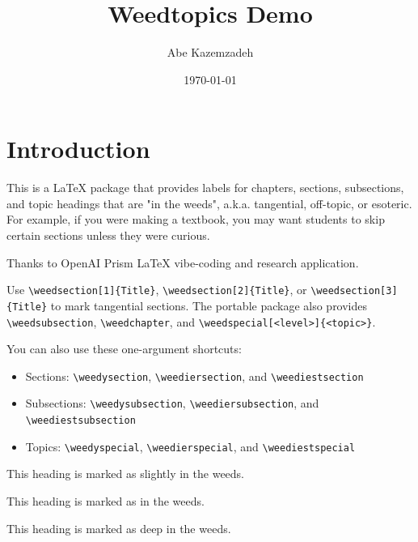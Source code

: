 \documentclass[11pt]{article}
\title{Weedtopics Demo}
\author{Abe Kazemzadeh}
\date{\today}
\begin{document}
\maketitle
\tableofcontents

\section{Introduction}

This is a LaTeX package that provides labels for chapters, sections, subsections, and topic headings
that are "in the weeds", a.k.a. tangential, off-topic, or esoteric.  For example, if you were making 
a textbook, you may want students to skip certain sections unless they were curious.

Thanks to OpenAI Prism \LaTeX{} vibe-coding and research application.

Use \verb|\weedsection[1]{Title}|, \verb|\weedsection[2]{Title}|, or
\verb|\weedsection[3]{Title}| to mark tangential sections. The portable package
also provides \verb|\weedsubsection|, \verb|\weedchapter|, and
\verb|\weedspecial[<level>]{<topic>}|.

You can also use these one-argument shortcuts:
\begin{itemize}
  \item Sections: \verb|\weedysection|, \verb|\weediersection|, and \verb|\weediestsection|
  \item Subsections: \verb|\weedysubsection|, \verb|\weediersubsection|, and \verb|\weediestsubsection|
  \item Topics: \verb|\weedyspecial|, \verb|\weedierspecial|, and \verb|\weediestspecial|
\end{itemize}



This heading is marked as slightly in the weeds.


This heading is marked as in the weeds.


This heading is marked as deep in the weeds.

\printindex
\end{document}
